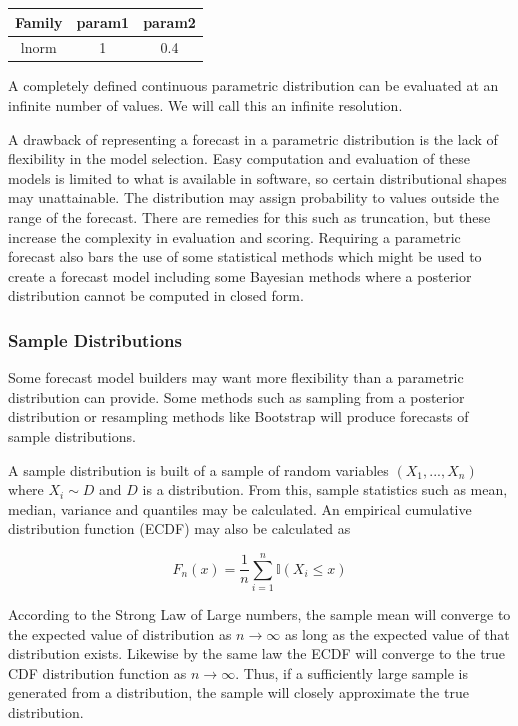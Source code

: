 \documentclass{article}\usepackage[]{graphicx}\usepackage[]{color}
\begin{document}
\begin{table}[h!]
\label{tab:pstor}
\centering
 \begin{tabular}{|c c c|} 
 \hline
 Family & param1 & param2 \\ [0.5ex] 
 \hline
 lnorm & 1 & 0.4 \\ 
 \hline
 \end{tabular}
\end{table}

A completely defined continuous parametric distribution can be evaluated at an
infinite number of values. We will call this an infinite resolution.


A drawback of representing a forecast in a parametric distribution is the lack 
of flexibility in the model selection. Easy computation and evaluation of these 
models is limited to what is available in software, so certain distributional
shapes may unattainable. The distribution may assign probability to values
outside the range of the forecast. There are remedies for this such as 
truncation, but these increase the complexity in evaluation and scoring.
Requiring a parametric forecast also bars the use of some statistical methods
which might be used to create a forecast model including some Bayesian methods
where a posterior distribution cannot be computed in closed form.


\subsubsection{Sample Distributions}
Some forecast model builders may want more flexibility than a parametric 
distribution can provide. Some methods such as sampling from a posterior 
distribution or resampling methods like Bootstrap will produce forecasts of
sample distributions. 

A sample distribution is built of a sample of random variables 
$(X_1,...,X_n)$ where $X_i \sim D$ and $D$ is a distribution. From this, sample
statistics such as mean, median, variance and quantiles may be calculated. 
An empirical cumulative distribution function (ECDF) may also be calculated as

\begin{equation}
\label{eq:ecdf}
  F_n(x) = \frac{1}{n} \sum_{i=1}^n \mathbb{I}(X_i \leq x)
\end{equation}

According to the Strong Law of Large numbers, the sample mean will converge to
the expected value of distribution as $n \rightarrow \infty$ as long as the 
expected value of that distribution exists. Likewise by the same law the 
ECDF will converge to the true CDF 
distribution function as $n \rightarrow \infty$. Thus, if a sufficiently large 
sample is generated from a distribution, the sample will closely approximate the 
true distribution. 
\end{document}
